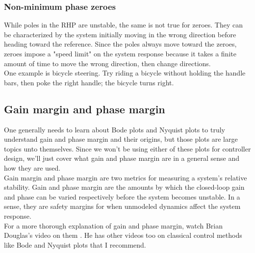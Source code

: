 \subsubsection{Non-minimum phase zeroes}

While poles in the RHP are unstable, the same is not true for zeroes. They can
be characterized by the \gls{system} initially moving in the wrong direction
before heading toward the \gls{reference}. Since the poles always move toward
the zeroes, zeroes impose a "speed limit" on the \gls{system} response because
it takes a finite amount of time to move the wrong direction, then change
directions. \\

One example is bicycle steering. Try riding a bicycle without holding the handle
bars, then poke the right handle; the bicycle turns right.

\subsection{Gain margin and phase margin} \label{sec:gain-phase-margin}

One generally needs to learn about Bode plots and Nyquist plots to truly
understand gain and phase margin and their origins, but those plots are large
topics unto themselves. Since we won't be using either of these plots for
controller design, we'll just cover what gain and phase margin are in a general
sense and how they are used. \\

Gain margin and phase margin are two metrics for measuring a system's relative
stability. Gain and phase margin are the amounts by which the closed-loop gain
and phase can be varied respectively before the system becomes unstable. In a
sense, they are safety margins for when unmodeled dynamics affect the system
response. \\

For a more thorough explanation of gain and phase margin, watch Brian Douglas's
video on them \cite{bib:gain_phase_margin}. He has other videos too on classical
control methods like Bode and Nyquist plots that I recommend.
